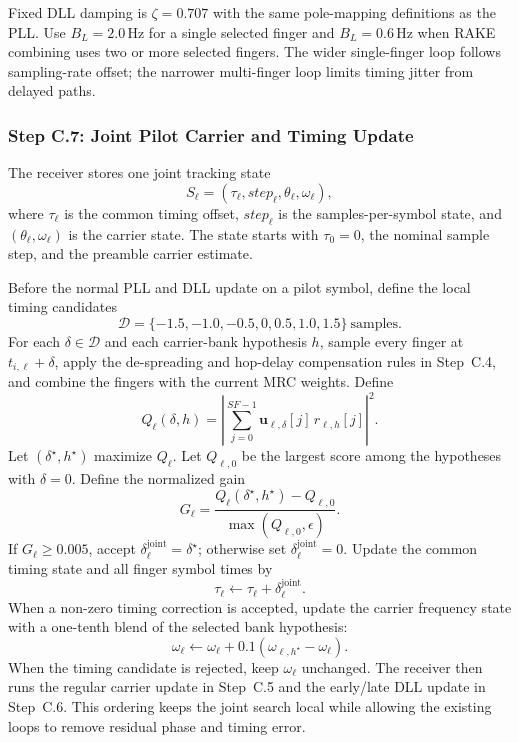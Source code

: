 \documentclass[11pt]{article}
\begin{document}
Fixed DLL damping is $\zeta=0.707$ with the same pole-mapping definitions as the PLL. Use
$B_L=2.0\,\text{Hz}$ for a single selected finger and $B_L=0.6\,\text{Hz}$ when RAKE
combining uses two or more selected fingers. The wider single-finger loop follows sampling-rate
offset; the narrower multi-finger loop limits timing jitter from delayed paths.

\subsubsection{Step C.7: Joint Pilot Carrier and Timing Update}

The receiver stores one joint tracking state
\[
  S_\ell=(\tau_\ell,\mathit{step}_\ell,\theta_\ell,\omega_\ell),
\]
where $\tau_\ell$ is the common timing offset, $\mathit{step}_\ell$ is the
samples-per-symbol state, and $(\theta_\ell,\omega_\ell)$ is the carrier state.
The state starts with $\tau_0=0$, the nominal sample step, and the preamble carrier estimate.

Before the normal PLL and DLL update on a pilot symbol, define the local timing candidates
\[
  \mathcal{D}=\{-1.5,-1.0,-0.5,0,0.5,1.0,1.5\}\ \text{samples}.
\]
For each $\delta\in\mathcal{D}$ and each carrier-bank hypothesis $h$, sample every finger at
$t_{i,\ell}+\delta$, apply the de-spreading and hop-delay compensation rules in Step~C.4,
and combine the fingers with the current MRC weights. Define
\[
  Q_{\ell}(\delta,h)=\left|\sum_{j=0}^{\mathit{SF}-1}
      \mathbf{u}_{\ell,\delta}[j]\,r_{\ell,h}[j]\right|^2.
\]
Let $(\delta^\star,h^\star)$ maximize $Q_\ell$. Let $Q_{\ell,0}$ be the largest score
among the hypotheses with $\delta=0$. Define the normalized gain
\[
  G_\ell=\frac{Q_\ell(\delta^\star,h^\star)-Q_{\ell,0}}
                 {\max(Q_{\ell,0},\epsilon)}.
\]
If $G_\ell\ge 0.005$, accept $\delta_\ell^{\mathrm{joint}}=\delta^\star$; otherwise set
$\delta_\ell^{\mathrm{joint}}=0$. Update the common timing state and all finger symbol times by
\[
  \tau_\ell\leftarrow\tau_\ell+\delta_\ell^{\mathrm{joint}}.
\]
When a non-zero timing correction is accepted, update the carrier frequency state with a
one-tenth blend of the selected bank hypothesis:
\[
  \omega_\ell\leftarrow\omega_\ell+0.1\left(\omega_{\ell,h^\star}-\omega_\ell\right).
\]
When the timing candidate is rejected, keep $\omega_\ell$ unchanged. The receiver then runs
the regular carrier update in Step~C.5 and the early/late DLL update in Step~C.6. This ordering
keeps the joint search local while allowing the existing loops to remove residual phase and
timing error.
\end{document}
